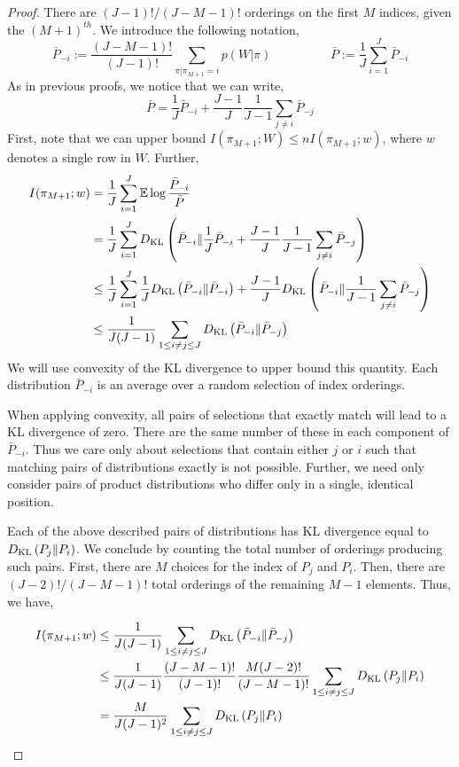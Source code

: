 \begin{proof}
There are $(J-1)!/(J-M-1)!$ orderings on the first $M$ indices, given the $(M+1)^{th}$. We introduce the following notation,
\[\bar{P}_{-i} := \frac{(J-M-1)!}{(J-1)!} \sum_{\pi|\pi_{M+1}=i} p(W|\pi) \hspace{2cm} \bar{P} := \frac{1}{J} \sum_{i=1}^{J} \bar{P}_{-i}\]
As in previous proofs, we notice that we can write,
\[\bar{P} = \frac{1}{J} \bar{P}_{-i} + \frac{J-1}{J} \frac{1}{J-1} \sum_{j \neq i} \bar{P}_{-j}\]
First, note that we can upper bound $I(\pi_{M+1};W) \leq n I(\pi_{M+1};w)$, where $w$ denotes a single row in $W$. Further,
\begin{align*}
    I(\pi_{M+1}; w) &= \frac{1}{J}\sum_{i=1}^{J} \mathbb{E} \log \frac{\bar{P}_{-i}}{\bar{P}}\\
    &= \frac{1}{J}\sum_{i=1}^{J} D_{\mathrm{KL}}\left(\bar{P}_{-i}\Vert\frac{1}{J} \bar{P}_{-i} + \frac{J-1}{J} \frac{1}{J-1} \sum_{j \neq i} \bar{P}_{-j}\right) \\
    &\leq \frac{1}{J}\sum_{i=1}^{J} \frac{1}{J}D_{\mathrm{KL}}\left(\bar{P}_{-i}\Vert\bar{P}_{-i}\right) + \frac{J-1}{J} D_{\mathrm{KL}}\left(\bar{P}_{-i}\Vert\frac{1}{J-1} \sum_{j \neq i} \bar{P}_{-j}\right) \\
    &\leq \frac{1}{J(J-1)} \sum_{1 \leq i\neq j \leq J} D_{\mathrm{KL}}\left(\bar{P}_{-i}\Vert\bar{P}_{-j}\right)
\end{align*}
We will use convexity of the KL divergence to upper bound this quantity. Each distribution $\bar{P}_{-i}$ is an average over a random selection of index orderings.

When applying convexity, all pairs of selections that exactly match will lead to a KL divergence of zero. There are the same number of these in each component of $\bar{P}_{-i}$. Thus we care only about selections that contain either $j$ or $i$ such that matching pairs of distributions exactly is not possible. Further, we need only consider pairs of product distributions who differ only in a single, identical position.

Each of the above described pairs of distributions has KL divergence equal to $D_{\mathrm{KL}}\left(P_{j}\Vert P_{i}\right)$. We conclude by counting the total number of orderings producing such pairs. First, there are $M$ choices for the index of $P_j$ and $P_i$. Then, there are $(J-2)!/(J-M-1)!$ total orderings of the remaining $M-1$ elements. Thus, we have,

\begin{align*}
I(\pi_{M+1};w) &\leq \frac{1}{J(J-1)} \sum_{1 \leq i\neq j \leq J} D_{\mathrm{KL}}\left(\bar{P}_{-i}\Vert\bar{P}_{-j}\right)\\
&\leq \frac{1}{J(J-1)} \frac{(J-M-1)!}{(J-1)!}\frac{M(J-2)!}{(J-M-1)!} \sum_{1 \leq i\neq j \leq J} D_{\mathrm{KL}}\left(P_{j}\Vert P_{i}\right)\\
&= \frac{M}{J(J-1)^2} \sum_{1 \leq i\neq j \leq J} D_{\mathrm{KL}}\left(P_{j}\Vert P_{i}\right)\\
\end{align*}
\end{proof}

